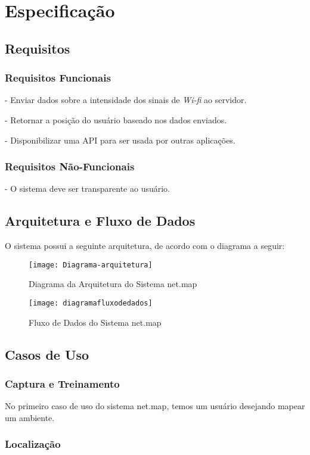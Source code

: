 
\chapter{Especificação}\label{chp:espec}
\section{Requisitos}\label{sec:req}

\subsection{Requisitos Funcionais}
- Enviar dados sobre a intensidade dos sinais de \textit{Wi-fi} ao servidor. \par
- Retornar a posição do usuário baseado nos dados enviados.\par
- Disponibilizar uma API para ser usada por outras aplicações.\par


\subsection{Requisitos Não-Funcionais}

- O sistema deve ser transparente ao usuário.\par


\section{Arquitetura e Fluxo de Dados}


O sistema possui a seguinte arquitetura, de acordo com o diagrama a seguir:


\begin{figure}[H]
	\centering
	\caption{Diagrama da Arquitetura do Sistema net.map}
  \texttt{[image: Diagrama-arquitetura]}
\label{fig:diagramaarq}

\end{figure}



\begin{figure}[H]
	\centering
	\caption{Fluxo de Dados do Sistema net.map}
  \texttt{[image: diagramafluxodedados]}
\label{fig:diagramafluxo}

\end{figure}


\section{Casos de Uso}

\subsection{Captura e Treinamento}

No primeiro caso de uso do sistema net.map, temos um usuário desejando mapear um ambiente. 


\subsection{Localização}